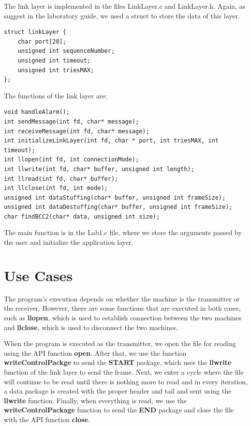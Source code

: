 \documentclass[a4paper]{article}
\begin{document}
The link layer is implemented in the files LinkLayer.c and LinkLayer.h. Again, as suggest in the laboratory guide, we used a struct to store the data of this layer. 

\begin{lstlisting}
struct linkLayer {
    char port[20];
    unsigned int sequenceNumber;
    unsigned int timeout;
    unsigned int triesMAX;
};
\end{lstlisting}

The functions of the link layer are:

\begin{lstlisting}
void handleAlarm();
int sendMessage(int fd, char* message);
int receiveMessage(int fd, char* message);
int initializeLinkLayer(int fd, char * port, int triesMAX, int timeout);
int llopen(int fd, int connectionMode);
int llwrite(int fd, char* buffer, unsigned int length);
int llread(int fd, char* buffer);
int llclose(int fd, int mode);
unsigned int dataStuffing(char* buffer, unsigned int frameSize);
unsigned int dataDestuffing(char* buffer, unsigned int frameSize);
char findBCC2(char* data, unsigned int size);
\end{lstlisting}

The main function is in the Lab1.c file, where we store the arguments passed by the user and initialize the application layer.

\section{Use Cases}

The program's execution depends on whether the machine is the transmitter or the receiver. However, there are some functions that are executed in both cases, such as \textbf{llopen}, which is used to establish connection between the two machines and \textbf{llclose}, which is used to disconnect the two machines. 

When the program is executed as the transmitter, we open the file for reading using the API function \textbf{open}. After that, we use the function \textbf{writeControlPackge} to send the \textbf{START} package, which uses the \textbf{llwrite} function of the link layer to send the frame. Next, we enter a cycle where the file will continue to be read until there is nothing more to read and in every iteration, a data package is created with the proper header and tail and sent using the \textbf{llwrite} function. Finally, when everything is read, we use the \textbf{writeControlPackage} function to send the \textbf{END} package and close the file with the API function \textbf{close}. 
\end{document}
